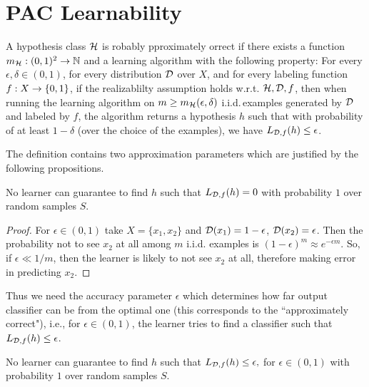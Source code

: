 \documentclass[11pt,a4paper]{article}
\begin{document}
\section{PAC Learnability}

\begin{mydef} \label{def:PAC_learning}
A hypothesis class $\mathcal{H}$ is robably pproximately orrect  if there exists a function $m_{\mathcal{H}}:(0,1)^2\rightarrow \mathbb{N}$ and a learning algorithm with the following property: For every $\epsilon,\delta\in (0,1)$, for every distribution $\mathcal{D}$ over $X$, and for every labeling function $f:X\rightarrow \{0,1\}$, if the realizablilty assumption holds w.r.t. $\mathcal{H},\mathcal{D}, f$, then when running the learning algorithm on $m\ge m_{\mathcal{H}}(\epsilon,\delta)$ i.i.d.\,examples generated by $\mathcal{D}$ and labeled by $f$, the algorithm returns a hypothesis $h$ such that with probability of at least $1-\delta$ (over the choice of the examples), we have $L_{\mathcal{D},f}(h)\le \epsilon$.
\end{mydef}

The definition contains two approximation parameters which are justified by the following propositions.

\begin{prop}
No learner can guarantee to find $h$ such that $L_{\mathcal{D}, f}(h) = 0$ with probability $1$ over random samples $S$.
\end{prop}

\begin{proof}
For $\epsilon\in (0,1)$ take $X = \{x_1,x_2\}$ and $\mathcal{D}(x_1) =1- \epsilon$, $\mathcal{D}(x_2) = \epsilon$. Then the probability not to see $x_2$ at all among $m$ i.i.d. examples is $(1-\epsilon)^m\approx e^{-\epsilon m}$. So, if $\epsilon \ll 1/m$, then the learner is likely to not see $x_2$ at all, therefore making error in predicting $x_2$.
\end{proof}

Thus we need the accuracy parameter $\epsilon$ which determines how far output classifier can be from the optimal one (this corresponds to the ``approximately correct"), i.e., for $\epsilon\in (0,1)$, the learner tries to find a classifier such that $L_{\mathcal{D}, f}(h)\le \epsilon$.

\begin{prop}
No learner can guarantee to find $h$ such that $L_{\mathcal{D}, f}(h) \le \epsilon,$ for $\epsilon\in (0,1)$ with probability $1$ over random samples $S$.
\end{prop}
\end{document}
